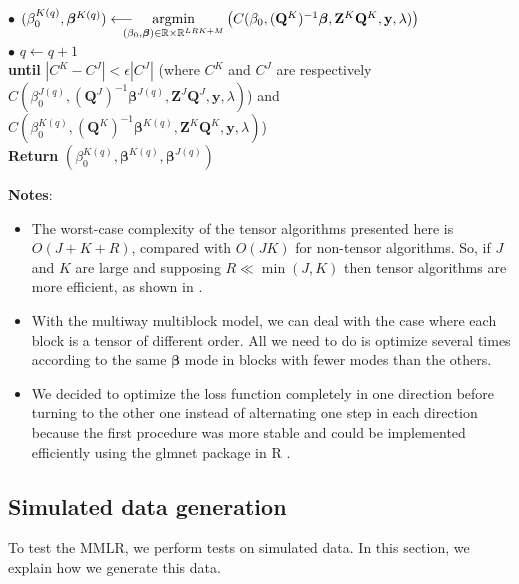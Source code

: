 \documentclass[preprint,12pt]{elsarticle}
\begin{document}
\begin{mdframed}[leftmargin=0cm, rightmargin=0.2cm]
    \phantom{a}\hspace{25 pt}  $\bullet$ $(\beta_0^{K {(q)}}, \bm{\beta}^{K {(q)}}) \longleftarrow \hspace{-10 pt} \underset{(\beta_0, \bm{\beta}) \in \mathbb{R} \times \mathbb{R}^{LRK + M}}{\text{argmin}} \left( C(\beta_0, (\mathbf{Q}^K)^{-1}\bm{\beta},\mathbf{Z}^K \mathbf{Q}^K, \mathbf{y}, \lambda) \right)$\\[2 pt]
    \phantom{a}\hspace{25 pt}  $\bullet$ $q \leftarrow q + 1$\\[4 pt]
    \phantom{a}\hspace{8 pt}  \textbf{until} $|C^K - C^J| < \epsilon |C^J| $ \; (where $C^K$ and $C^J$ are respectively\\[2 pt]
    \phantom{a}\hspace{42 pt} $C(\beta_0^{J {(q)}}, (\mathbf{Q}^J)^{-1}\bm{\beta}^{J {(q)}},\mathbf{Z}^J \mathbf{Q}^J, \mathbf{y}, \lambda)$) and $C(\beta_0^{K {(q)}}, (\mathbf{Q}^K)^{-1}\bm{\beta}^{K {(q)}},\mathbf{Z}^K \mathbf{Q}^K, \mathbf{y}, \lambda)$)\\ [8 pt]
    \textbf{Return} $(\beta_0^{K {(q)}},\bm{\beta}^{K(q)}, \bm{\beta}^{J(q)})$
\end{mdframed}

\vspace{5 pt}
\noindent \textbf{Notes}:
\begin{itemize}
    \item The worst-case complexity of the tensor algorithms presented here is $O(J + K + R)$, compared with $O(JK)$ for non-tensor algorithms. So, if $J$ and $K$ are large and supposing $R \ll \min(J,K)$ then tensor algorithms are more efficient, as shown in \cite{multi_rank_r}.
    \item With the multiway multiblock model, we can deal with the case where each block is a tensor of different order. All we need to do is optimize several times according to the same $\bm{\beta}$ mode in blocks with fewer modes than the others.
    \item We decided to optimize the loss function completely in one direction before turning to the other one instead of alternating one step in each direction because the first procedure was more stable and could be implemented efficiently using the glmnet package in R \cite{glmnet}.
\end{itemize}

\vspace{7 pt}


\subsection{Simulated data generation}
\label{sec:simulated_data}
\noindent To test the MMLR, we perform tests on simulated data. In this section, we explain how we generate this data.
\end{document}
